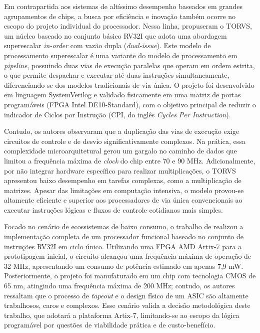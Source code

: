 Em contrapartida aos sistemas de altíssimo desempenho baseados em grandes agrupamentos de chips, a busca por eficiência e inovação também ocorre no escopo do projeto individual do processador. Nessa linha,  propuseram o TORVS, um núcleo baseado no conjunto básico RV32I que adota uma abordagem superescalar \textit{in-order} com vazão dupla (\textit{dual-issue}). Este modelo de processamento superescalar é uma variante do modelo de processamento em \textit{pipeline}, possuindo duas vias de execução paralelas que operam em ordem estrita, o que permite despachar e executar até duas instruções simultaneamente, diferenciando-se dos modelos tradicionais de via única. O projeto foi desenvolvido em linguagem SystemVerilog e validado fisicamente em uma matriz de portas programáveis (FPGA Intel DE10-Standard), com o objetivo principal de reduzir o indicador de Ciclos por Instrução (CPI, do inglês \textit{Cycles Per Instruction}).

Contudo, os autores observaram que a duplicação das vias de execução exige circuitos de controle e de desvio significativamente complexos. Na prática, essa complexidade microarquitetural gerou um gargalo no caminho de dados que limitou a frequência máxima de \textit{clock} do chip entre 70 e 90 MHz. Adicionalmente, por não integrar hardware específico para realizar multiplicações, o TORVS apresentou baixo desempenho em tarefas complexas, como a multiplicação de matrizes. Apesar das limitações em computação intensiva, o modelo provou-se altamente eficiente e superior aos processadores de via única convencionais ao executar instruções lógicas e fluxos de controle cotidianos mais simples.

Focado no cenário de ecossistemas de baixo consumo, o trabalho de  realizou a implementação completa de um processador funcional baseado no conjunto de instruções RV32I em ciclo único. Utilizando uma FPGA AMD Artix-7 para a prototipagem inicial, o circuito alcançou uma frequência máxima de operação de 32 MHz, apresentando um consumo de potência estimado em apenas 7,9 mW. Posteriormente, o projeto foi manufaturado em um chip com tecnologia CMOS de 65 nm, atingindo uma frequência máxima de 200 MHz; contudo, os autores ressaltam que o processo de \textit{tapeout} e o design físico de um ASIC são altamente trabalhosos, caros e complexos. Esse cenário valida a decisão metodológica deste trabalho, que adotará a plataforma Artix-7, limitando-se ao escopo da lógica programável por questões de viabilidade prática e de custo-benefício.

